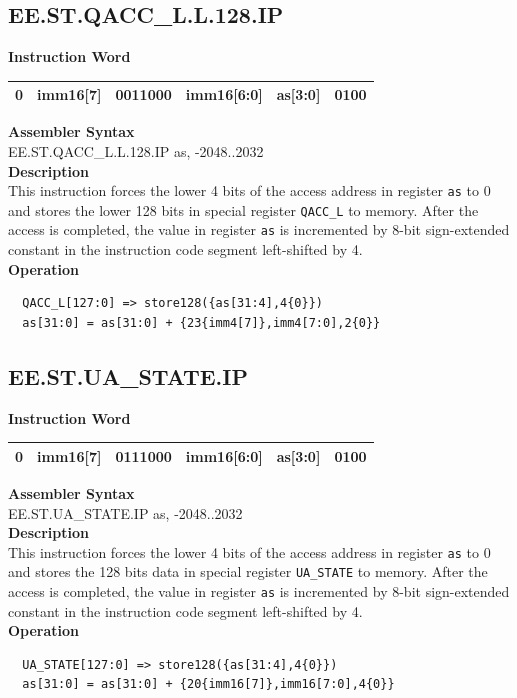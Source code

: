 \clearpage
\subsection{EE.ST.QACC\_L.L.128.IP}\label{instruction:EESTQACCLL128IP}
\setlength\tabcolsep{6pt}
\textbf{Instruction Word} \\
\begin{tabular}{|c|c|c|c|c|c|}
	\hline
	0 & imm16[7] & 0011000 & imm16[6:0] & as[3:0] & 0100 \\
	\hline
\end{tabular}

\textbf{Assembler Syntax} \\
EE.ST.QACC\_L.L.128.IP as, -2048..2032 \\
\textbf{Description} \\
This instruction forces the lower 4 bits of the access address in register \lstinline{as} to 0 and stores the lower 128 bits in special register \lstinline{QACC_L} to memory. After the access is completed, the value in register \lstinline{as} is incremented by 8-bit sign-extended constant in the instruction code segment left-shifted by 4.\\
\textbf{Operation}
\begin{lstlisting}
  QACC_L[127:0] => store128({as[31:4],4{0}})
  as[31:0] = as[31:0] + {23{imm4[7]},imm4[7:0],2{0}}
\end{lstlisting}

\clearpage
\subsection{EE.ST.UA\_STATE.IP}\label{instruction:EESTUASTATEIP}
\setlength\tabcolsep{6pt}
\textbf{Instruction Word} \\
\begin{tabular}{|c|c|c|c|c|c|}
	\hline
	0 & imm16[7] & 0111000 & imm16[6:0] & as[3:0] & 0100 \\
	\hline
\end{tabular}

\textbf{Assembler Syntax} \\
EE.ST.UA\_STATE.IP as, -2048..2032 \\
\textbf{Description} \\
This instruction forces the lower 4 bits of the access address in register \lstinline{as} to 0 and stores the 128 bits data in special register \lstinline{UA_STATE} to memory. After the access is completed, the value in register \lstinline{as} is incremented by 8-bit sign-extended constant in the instruction code segment left-shifted by 4.\\
\textbf{Operation}
\begin{lstlisting}
  UA_STATE[127:0] => store128({as[31:4],4{0}})
  as[31:0] = as[31:0] + {20{imm16[7]},imm16[7:0],4{0}}
\end{lstlisting}

